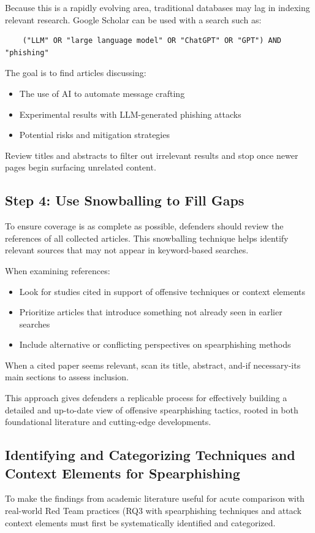Because this is a rapidly evolving area, traditional databases may lag in indexing relevant research. Google Scholar can be used with a search such as:
\begin{lstlisting}
    ("LLM" OR "large language model" OR "ChatGPT" OR "GPT") AND "phishing"
\end{lstlisting}

The goal is to find articles discussing:

\begin{itemize}
    \item The use of AI to automate message crafting
    \item Experimental results with LLM-generated phishing attacks
    \item Potential risks and mitigation strategies
\end{itemize}

Review titles and abstracts to filter out irrelevant results and stop once newer pages begin surfacing unrelated content.

\subsection{Step 4: Use Snowballing to Fill Gaps}
To ensure coverage is as complete as possible, defenders should review the references of all collected articles. This snowballing technique helps identify relevant sources that may not appear in keyword-based searches.

When examining references:
\begin{itemize}
    \item Look for studies cited in support of offensive techniques or context elements
    \item Prioritize articles that introduce something not already seen in earlier searches
    \item Include alternative or conflicting perspectives on spearphishing methods
\end{itemize}

When a cited paper seems relevant, scan its title, abstract, and-if necessary-its main sections to assess inclusion.

This approach gives defenders a replicable process for effectively building a detailed and up-to-date view of offensive spearphishing tactics, rooted in both foundational literature and cutting-edge developments.

\subsection{Identifying and Categorizing Techniques and Context Elements for Spearphishing}
To make the findings from academic literature useful for acute comparison with real-world Red Team practices (RQ3 with spearphishing techniques and attack context elements must first be systematically identified and categorized.

